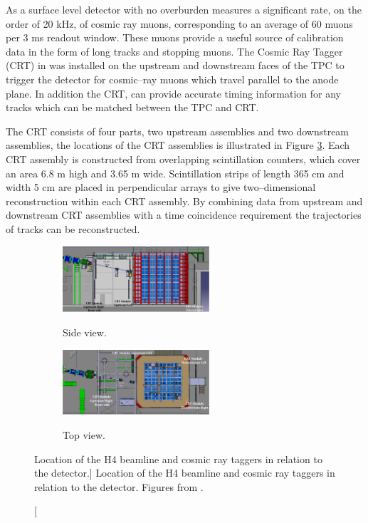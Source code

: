 As a surface level detector with no overburden \protodune{} measures a
significant rate, on the order of 20 kHz, of cosmic ray muons, corresponding 
to an average of 60 muons per 3 ms readout window. These muons provide a 
useful source of calibration data in the form of long tracks and stopping 
muons.  The Cosmic Ray Tagger (CRT) in \protodune{} was installed on the 
upstream and downstream faces of the TPC to trigger the detector for 
cosmic--ray muons which travel parallel to the anode plane. In addition the 
CRT, can provide accurate timing information for any tracks which can be matched
between the TPC and CRT.

The CRT consists of four parts, two upstream assemblies and two downstream
assemblies, the locations of the CRT assemblies is illustrated in Figure
\ref{fig:pdsp_CRT}. Each CRT assembly is constructed from overlapping 
scintillation counters, which cover an area 6.8 m high and 3.65 m wide. 
Scintillation strips of length 365 cm and width 5 cm are placed in 
perpendicular arrays to give two--dimensional reconstruction within each CRT 
assembly. By combining data from upstream and downstream CRT assemblies with a 
time coincidence requirement the trajectories of tracks can be reconstructed.

\begin{figure}

	\centering

	\begin{subfigure}[b]{\textwidth}
		\centering
		\includegraphics[width=0.6\textwidth]{figures/crt_side.pdf}
		\label{fig:crt_side}
		\caption{Side view.}
	\end{subfigure}

	\vspace{3mm}

	\begin{subfigure}[b]{\textwidth}
		\centering
		\includegraphics[width=0.6\textwidth]{figures/crt_top.pdf}
		\label{fig:crt_top}
		\caption{Top view.}
	\end{subfigure}

	\caption
	[Location of the H4 beamline and cosmic ray taggers in relation to the
	\protodune{} detector.]
	{Location of the H4 beamline and cosmic ray taggers in relation to the
	\protodune{} detector. Figures from \cite{protoduneperf}.}

	\label{fig:pdsp_CRT}

\end{figure}

